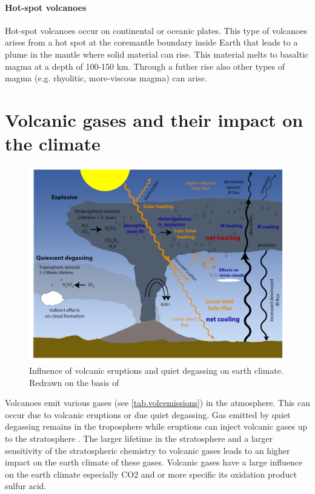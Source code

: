 \documentclass  [
  paper    = a4,
  BCOR     = 10mm,
  twoside,
  fontsize = 12pt,
  fleqn,
  toc      = bibnumbered,
  toc      = listofnumbered,
  numbers  = noendperiod,
  headings = normal,
  listof   = leveldown,
  version  = 3.03
]                                       {scrreprt}
\begin{document}
\paragraph{ Hot-spot volcanoes} Hot-spot volcanoes occur on continental or oceanic plates. This type of volcanoes arises from a hot spot at the coremantle boundary inside Earth that leads to a plume in the mantle where solid material can rise. This material melts to basaltic magma at a depth of 100-150 km. Through a futher rise also other types of magma (e.g. rhyolitic, more-viscous magma) can arise.


\section{Volcanic gases and their impact on the climate}
\begin{figure}
	\centering
	\includegraphics[width=0.8\linewidth]{Bilder/Simon/Bilder_Tung/Climate_Influence}
	\caption{Influence of volcanic eruptions and quiet degassing on earth climate. Redrawn on the basis of \cite{robock2000volcanic}}
	\label{fig:climateinfluence}
\end{figure}
Volcanoes emit various gases (see \cref{tab.volcemissions}) in the atmosphere. This can occur due to volcanic eruptions or due quiet degassing. Gas emitted by quiet degassing remains in the troposphere while eruptions can inject volcanic gases up to the stratosphere \citet{robock2000volcanic}. The larger lifetime in the stratosphere and a larger sensitivity of the stratospheric chemistry to volcanic gases leads to an higher impact on the earth climate of these gases.
Volcanic gases have a large influence on the earth climate especially CO2 and   or more specific its oxidation product sulfur acid.\\ 
\end{document}

